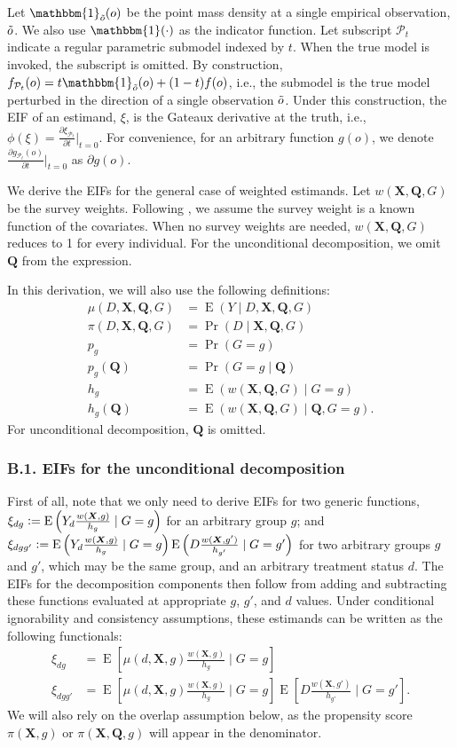 \documentclass[12pt,a4paper]{article}
\newcommand{\E}{\operatorname{E}}
\def\X{{\boldsymbol X}}
\def\Q{{\boldsymbol Q}}
\DeclareMathOperator{\Pro}{Pr}
\def\one{\mathbbm{1}}
\newcommand{\defeq}{\vcentcolon=}
\begin{document}
Let $\one_{\Tilde{o}}(o)$ be the point mass density at a single empirical observation,  $\Tilde{o}$. We also use $\one(\cdot)$ as the indicator function. Let subscript $\mathcal{P}_t$ indicate a regular parametric submodel indexed by $t$. When the true model is invoked, the subscript is omitted. By construction, $f_{\mathcal{P}_t}(o)=t \one_{\Tilde{o}}(o) + (1-t)f(o)$, i.e., the submodel is the true model perturbed in the direction of a single observation $\Tilde{o}$. Under this construction, the EIF of an estimand, $\xi$, is the Gateaux derivative at the truth, i.e., $\phi(\xi)=\frac{\partial \xi_{\mathcal{P}_t}}{\partial t} \big|_{t=0}$. For convenience, for an arbitrary function $g(o)$, we denote $ \frac{\partial g_{\mathcal{P}_t}(o)}{\partial t} \big|_{t=0}$ as $\partial g(o)$. 

We derive the EIFs for the general case of  weighted estimands. Let $w(\X, \Q, G)$ be the  survey weights. Following \citet{hirano_efficient_2003}, we assume the survey weight is a known function of the covariates. When no survey weights are needed, $w(\X,\Q, G)$ reduces to 1 for every individual. For the unconditional decomposition, we omit $\Q$ from the expression.

In this derivation, we will also use the following definitions:
\begin{align*}
    \mu(D,\X,\Q,G)&=\E(Y \mid D, \X, \Q, G) \\
    \pi(D,\X, \Q, G) &= \Pro(D \mid \X, \Q, G) \\
    p_g &= \Pro(G=g) \\
    p_g(\Q) &= \Pro(G=g \mid \Q) \\
    h_g &= \E(w(\X, \Q, G) \mid G=g) \\
    h_g(\Q) &= \E(w(\X, \Q, G) \mid \Q, G=g).
\end{align*}
For unconditional decomposition, $\Q$ is omitted.

\subsubsection*{B.1. EIFs for the unconditional decomposition}
First of all, note that we only need to derive EIFs for two generic functions, $\xi_{dg} \defeq \E \left(Y_d \frac{ w(\X,g)}{h_g} \mid G=g  \right)$ for an arbitrary group $g$; and $\xi_{dgg'} \defeq \E \left(Y_d \frac{ w(\X,g)}{h_g} \mid G=g \right)\E \left(D \frac{ w(\X,g')}{h_{g'}}  \mid G=g' \right)$ for two arbitrary groups $g$ and $g'$, which may be the same group, and an arbitrary treatment status $d$. The EIFs for the decomposition components then follow from adding and subtracting these functions evaluated at appropriate $g$, $g'$, and $d$ values. Under conditional ignorability and consistency assumptions, these estimands can be written as the following functionals:
\begin{align*}
    \xi_{dg} &= \E \left[\mu(d,\X,g) \frac{ w(\X,g)}{h_g} \mid G=g \right] \\
    \xi_{dgg'} &= \E \left[\mu(d,\X,g) \frac{ w(\X,g)}{h_g} \mid G=g \right] \E \left[D \frac{ w(\X,g')}{h_{g'}}  \mid G=g' \right].
\end{align*}
We will also rely on the overlap assumption below, as the propensity score $\pi(\X,g)$ or $\pi(\X,\Q,g)$ will appear in the denominator.
\end{document}
